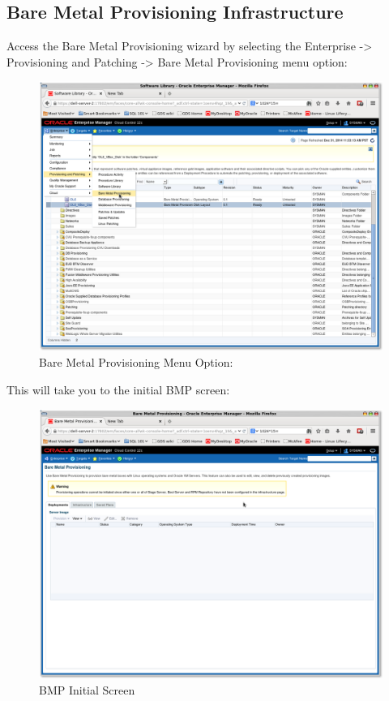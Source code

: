 \documentclass[11pt]{article}
\begin{document}
\subsection{Bare Metal Provisioning Infrastructure}
\label{sec-4-4}
Access the Bare Metal Provisioning wizard by selecting the Enterprise -> Provisioning and Patching -> Bare Metal Provisioning menu option:
\begin{figure}[htb]
\centering
\includegraphics[width=.9\linewidth]{./images/BMP_Menu_Option.png}
\caption{Bare Metal Provisioning Menu Option:}
\end{figure}
\clearpage
This will take you to the initial BMP screen:
\begin{figure}[htb]
\centering
\includegraphics[width=.9\linewidth]{./images/BMP_1.png}
\caption{BMP Initial Screen}
\end{figure}
\end{document}
